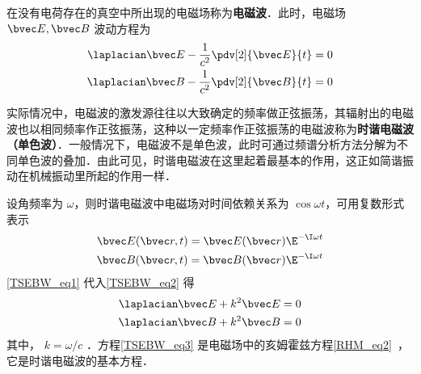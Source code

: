 在没有电荷存在的真空中所出现的电磁场称为\textbf{电磁波}．此时，电磁场 $\bvec E,\bvec B$ 波动方程为
\begin{equation}\label{TSEBW_eq2}
\begin{aligned}
\laplacian\bvec E-\frac{1}{c^2}\pdv[2]{\bvec E}{t}=0\\
\laplacian\bvec B-\frac{1}{c^2}\pdv[2]{\bvec B}{t}=0
\end{aligned}
\end{equation}

实际情况中，电磁波的激发源往往以大致确定的频率做正弦振荡，其辐射出的电磁波也以相同频率作正弦振荡，这种以一定频率作正弦振荡的电磁波称为\textbf{时谐电磁波（单色波）}．一般情况下，电磁波不是单色波，此时可通过频谱分析方法分解为不同单色波的叠加．由此可见，时谐电磁波在这里起着最基本的作用，这正如简谐振动在机械振动里所起的作用一样．

设角频率为 $\omega$，则时谐电磁波中电磁场对时间依赖关系为 $\cos\omega t$，可用复数形式表示
\begin{equation}\label{TSEBW_eq1}
\begin{aligned}
\bvec E(\bvec r,t)=\bvec E(\bvec r)\E^{-\I\omega t}\\
\bvec B(\bvec r,t)=\bvec B(\bvec r)\E^{-\I\omega t}
\end{aligned}
\end{equation}
\autoref{TSEBW_eq1} 代入\autoref{TSEBW_eq2} 得
\begin{equation}\label{TSEBW_eq3}
\begin{aligned}
\laplacian\bvec E+k^2\bvec E=0\\
\laplacian\bvec B+k^2\bvec B=0
\end{aligned}
\end{equation}
其中， $k=\omega/c$ ．方程\autoref{TSEBW_eq3} 是电磁场中的亥姆霍兹方程\autoref{RHM_eq2}~，它是时谐电磁波的基本方程．